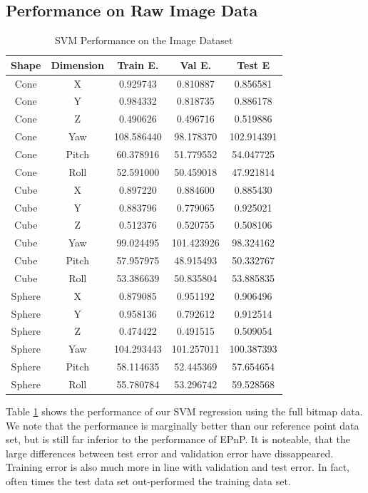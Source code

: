 \documentclass[journal]{IEEEtran}
\begin{document}
\subsection{Performance on Raw Image Data}

\begin{table}[h]
\caption{SVM Performance on the Image Dataset}
\label{SVM_Image}
\centering

\begin{tabular}{|c|c|c|c|c|}
\hline
Shape & Dimension & Train E. & Val E. & Test E\\
\hline
Cone & X & 0.929743 & 0.810887 & 0.856581\\
Cone & Y & 0.984332 & 0.818735 & 0.886178\\
Cone & Z & 0.490626 & 0.496716 & 0.519886\\
Cone & Yaw & 108.586440 & 98.178370 & 102.914391\\
Cone & Pitch & 60.378916 & 51.779552 & 54.047725\\
Cone & Roll & 52.591000 & 50.459018 & 47.921814\\
\hline
Cube & X & 0.897220 & 0.884600 & 0.885430\\
Cube & Y & 0.883796 & 0.779065 & 0.925021\\
Cube & Z & 0.512376 & 0.520755 & 0.508106\\
Cube & Yaw & 99.024495 & 101.423926 & 98.324162\\
Cube & Pitch & 57.957975 & 48.915493 & 50.332767\\
Cube & Roll & 53.386639 & 50.835804 & 53.885835\\
\hline
Sphere & X & 0.879085 & 0.951192 & 0.906496\\
Sphere & Y & 0.958136 & 0.792612 & 0.912514\\
Sphere & Z & 0.474422 & 0.491515 & 0.509054\\
Sphere & Yaw & 104.293443 & 101.257011 & 100.387393\\
Sphere & Pitch & 58.114635 & 52.445369 & 57.654654\\
Sphere & Roll & 55.780784 & 53.296742 & 59.528568\\
\hline
\end{tabular}

\end{table}

Table \ref{SVM_Image} shows the performance of our SVM regression using the full bitmap data. We note that the performance is marginally better than our reference point data set, but is still far inferior to the performance of EPnP. It is noteable, that the large differences between test error and validation error have dissappeared. Training error is also much more in line with validation and test error. In fact, often times the test data set out-performed the training data set.
\end{document}
